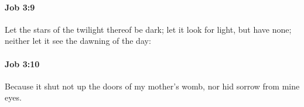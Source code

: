 		\paragraph{Job 3:9} %
			\label{JOB-3-9}

			Let the stars of the twilight thereof be dark; let it look for light, but have none; neither let it see the dawning of the day:


		\paragraph{Job 3:10} %
			\label{JOB-3-10}

			Because it shut not up the doors of my mother’s womb, nor hid sorrow from mine eyes.


